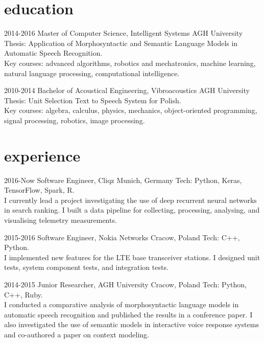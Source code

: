 \documentclass[]{friggeri-cv_osx}
\begin{document}

\begin{center}
\href{http:sebastiandziadzio.com}{\color{gray} \Large \faHome}
\href{mailto:sebastian.dziadzio@gmail.com}{\color{gray} \Large\faEnvelope}
\href{https://github.com/sebastiandziadzio}{\color{gray} \Large \faGithub}
\href{https://twitter.com/sebadzia}{\color{gray} \Large\faTwitter}
\href{http://pl.linkedin.com/in/sebastiandziadzio}{\color{gray} \Large\faLinkedin}
\end{center}
\vspace{0.5cm}

\section{education}
\begin{entrylist}
\entry
{2014-2016}
{Master of Computer Science, Intelligent Systems}
{AGH University}
{Thesis: Application of Morphosyntactic and Semantic Language Models in Automatic Speech Recognition.\\
Key courses: advanced algorithms, robotics and mechatronics, machine learning, natural language processing, computational intelligence.\\}

\entry
{2010-2014}
{Bachelor of Acoustical Engineering, Vibroacoustics}
{AGH University}
{Thesis: Unit Selection Text to Speech System for Polish.\\
Key courses: algebra, calculus, physics, mechanics, object-oriented programming, signal processing, robotics, image processing.\\}
\end{entrylist}


\section{experience}
\begin{entrylist}
\entry
{2016-Now}
{Software Engineer, Cliqz}
{Munich, Germany}
{Tech: Python, Keras, TensorFlow, Spark, R.\\I currently lead a project investigating the use of deep recurrent neural networks in search ranking. I built a data pipeline for collecting, processing, analysing, and visualising telemetry measurements.\\}

\entry
{2015-2016}
{Software Engineer, Nokia Networks}
{Cracow, Poland}
{Tech: C++, Python.\\I implemented new features for the LTE base transceiver stations. I designed unit tests, system component tests, and integration tests.\\}

\entry
{2014-2015}
{Junior Researcher, AGH University}
{Cracow, Poland}
{Tech: Python, C++, Ruby.\\I conducted a comparative analysis of morphosyntactic language models in automatic speech recognition and published the results in a conference paper. I also investigated the use of semantic models in interactive voice response systems and co-authored a paper on context modeling.\\}
\end{entrylist}
\end{document}
